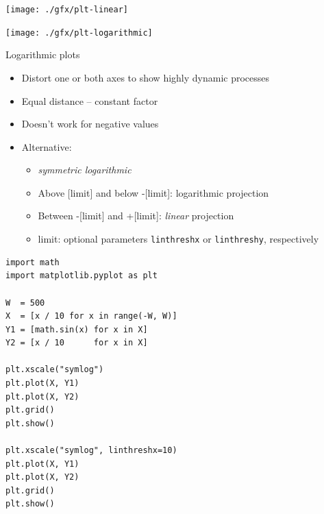 
\begin{frame}[fragile]
%
\begin{tcbraster}[raster columns=2,
                  raster equal height,
                  nobeforeafter,
                  raster column skip=0.5cm]
\begin{tcolorbox}[title=Linear Plot]
	\texttt{[image: ./gfx/plt-linear]}
\end{tcolorbox}
%
\begin{tcolorbox}[title=Logarithmic Plot]
	\texttt{[image: ./gfx/plt-logarithmic]}
\end{tcolorbox}
\end{tcbraster}
%
\end{frame}


\begin{frame}[fragile]{Logarithmic plots}
%
\begin{itemize}
\item Distort one or both axes to show highly dynamic processes
\item Equal distance -- constant factor
\item Doesn't work for negative values
\item Alternative: 
	\begin{itemize}
	\item \emph{symmetric logarithmic}
	\item Above [limit] and below -[limit]: logarithmic projection
	\item Between -[limit] and +[limit]: \emph{linear} projection
	\item limit: optional parameters \texttt{linthreshx} or \texttt{linthreshy}, respectively
	\end{itemize}
\end{itemize}
%
\end{frame}


\begin{frame}[fragile]
%
\begin{codebox}
\begin{verbatim}
import math
import matplotlib.pyplot as plt

W  = 500
X  = [x / 10 for x in range(-W, W)]
Y1 = [math.sin(x) for x in X]
Y2 = [x / 10      for x in X]

plt.xscale("symlog")
plt.plot(X, Y1)
plt.plot(X, Y2)
plt.grid()
plt.show()

plt.xscale("symlog", linthreshx=10)
plt.plot(X, Y1)
plt.plot(X, Y2)
plt.grid()
plt.show()
\end{verbatim}
\end{codebox}
%
\end{frame}

